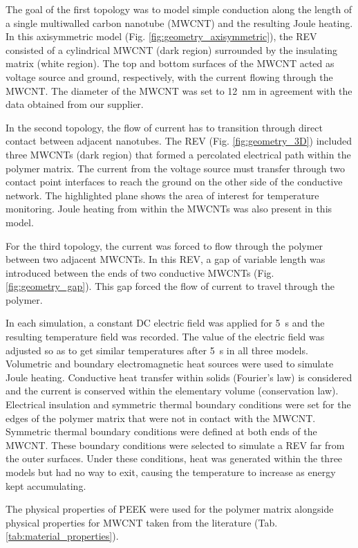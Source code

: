 \documentclass[11pt,review,times]{elsarticle}
\begin{document}
The goal of the first topology was to model simple conduction along the length of a single multiwalled carbon nanotube (MWCNT) and the resulting Joule heating. 
In this axisymmetric model (Fig. \ref{fig:geometry_axisymmetric}), the REV consisted of a cylindrical MWCNT (dark region) surrounded by the insulating matrix (white region). 
The top and bottom surfaces of the MWCNT acted as voltage source and ground, respectively, with the current flowing through the MWCNT. 
The diameter of the MWCNT was set to \SI{12}{\nano\metre} in agreement with the data obtained from our supplier. 

In the second topology, the flow of current has to transition through direct contact between adjacent nanotubes. 
The REV (Fig. \ref{fig:geometry_3D}) included three MWCNTs (dark region) that formed a percolated electrical path within the polymer matrix. 
The current from the voltage source must transfer through two contact point interfaces to reach the ground on the other side of the conductive network. 
The highlighted plane shows the area of interest for temperature monitoring. 
Joule heating from within the MWCNTs was also present in this model. 

For the third topology, the current was forced to flow through the polymer between two adjacent MWCNTs.
In this REV, a gap of variable length was introduced between the ends of two conductive MWCNTs (Fig. \ref{fig:geometry_gap}). 
This gap forced the flow of current to travel through the polymer.  

In each simulation, a constant DC electric field was applied for \SI{5}{\second} and the resulting temperature field was recorded. 
The value of the electric field was adjusted so as to get similar temperatures after \SI{5}{\second} in all three models. 
Volumetric and boundary electromagnetic heat sources were used to simulate Joule heating. 
Conductive heat transfer within solids (Fourier's law) is considered and the current is conserved within the elementary volume (conservation law). 
Electrical insulation and symmetric thermal boundary conditions were set for the edges of the polymer matrix that were not in contact with the MWCNT. 
Symmetric thermal boundary conditions were defined at both ends of the MWCNT. 
These boundary conditions were selected to simulate a REV far from the outer surfaces. 
Under these conditions, heat was generated within the three models but had no way to exit, causing the temperature to increase as energy kept accumulating.

The physical properties of PEEK were used for the polymer matrix alongside physical properties for MWCNT taken from the literature (Tab. \ref{tab:material_properties}). 
\end{document}
